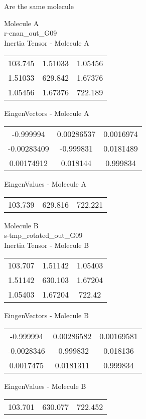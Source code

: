 \begin{center}
\vtab
\vtab
\textcolor{NavyBlue}{\Large Are the same molecule}
\end{center}
\newpage
\begin{multicols}{2}
\begin{center}
Molecule A \\ 
r-enan\_out\_G09
\\
Inertia Tensor - Molecule A \\
\vtab
\begin{tabular}{|c c c|}
103.745	 & 	1.51033	 & 	1.05456	 \\
1.51033	 & 	629.842	 & 	1.67376	 \\
1.05456	 & 	1.67376	 & 	722.189
\end{tabular}

\vtab
 EingenVectors - Molecule A     \\
\vtab
\begin{tabular}{|c c c|}
-0.999994	 & 	0.00286537	 & 	0.0016974	 \\
-0.00283409	 & 	-0.999831	 & 	0.0181489	 \\
0.00174912	 & 	0.018144	 & 	0.999834
\end{tabular}

\vtab
 EingenValues - Molecule A     \\
\vtab
\begin{tabular}{|c c c|}
103.739	 & 	629.816	 & 	722.221
\end{tabular}
\columnbreak

Molecule B \\ 
s-tmp\_rotated\_out\_G09
\\
Inertia Tensor - Molecule B \\
\vtab
\begin{tabular}{|c c c|}
103.707	 & 	1.51142	 & 	1.05403	 \\
1.51142	 & 	630.103	 & 	1.67204	 \\
1.05403	 & 	1.67204	 & 	722.42
\end{tabular}

\vtab
 EingenVectors - Molecule B     \\
\vtab
\begin{tabular}{|c c c|}
-0.999994	 & 	0.00286582	 & 	0.00169581	 \\
-0.0028346	 & 	-0.999832	 & 	0.018136	 \\
0.0017475	 & 	0.0181311	 & 	0.999834
\end{tabular}

\vtab
 EingenValues - Molecule B     \\
\vtab
\begin{tabular}{|c c c|}
103.701	 & 	630.077	 & 	722.452
\end{tabular}

\end{center}
\end{multicols}
